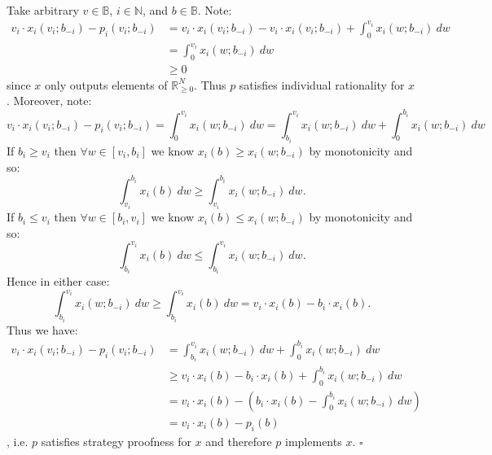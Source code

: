 \documentclass[11pt]{article}
\theoremstyle{definition}
\theoremstyle{plain}
\begin{document}
\\
Take arbitrary $v \in \mathbb{B}$, $i \in \mathbb{N}$, and $b \in \mathbb{B}$.
Note:
\begin{align*}
v_i\cdot x_i(v_i;b_{-i})-p_i(v_i;b_{-i})&=v_i\cdot x_i(v_i;b_{-i})-v_i \cdot
x_i(v_i;b_{-i})+\int_{0}^{v_i} x_i(w;b_{-i}) \ dw
\\
&=\int_{0}^{v_i} x_i(w;b_{-i}) \ dw
\\
&\geq 0
\end{align*}
since $x$ only outputs elements of $\mathbb{R}^N_{\geq 0}$. Thus $p$ satisfies
individual rationality for $x$. Moreover, note:
$$v_i\cdot x_i(v_i;b_{-i})-p_i(v_i;b_{-i})=\int_{0}^{v_i} x_i(w;b_{-i}) \ dw
=\int_{b_i}^{v_i}x_i(w;b_{-i}) \ dw+\int_{0}^{b_i}x_i(w;b_{-i}) \ dw$$
If $b_i \geq v_i$ then $\forall w \in [v_i,b_i]$ we know $x_i(b) \geq x_i(w;b_{-i})
$ by monotonicity and so:
$$\int_{v_i}^{b_i} x_i(b) \ dw \geq \int_{v_i}^{b_i} x_i(w; b_{-i}) \ dw.$$
If $b_i \leq v_i$ then $\forall w \in [b_i,v_i]$ we know $x_i(b) \leq x_i(w;b_{-i})
$ by monotonicity and so:
$$\int_{b_i}^{v_i} x_i(b) \ dw \leq \int_{b_i}^{v_i} x_i(w; b_{-i}) \ dw.$$
Hence in either case:
$$\int_{b_i}^{v_i} x_i(w; b_{-i}) \ dw \geq \int_{b_i}^{v_i} x_i(b) \ dw=v_i\cdot
x_i(b)-b_i\cdot x_i(b).$$
Thus we have:
\begin{align*}
v_i\cdot x_i(v_i;b_{-i})-p_i(v_i;b_{-i})&=\int_{b_i}^{v_i}x_i(w;b_{-i}) \ dw+
\int_{0}^{b_i}x_i(w;b_{-i}) \ dw
\\
&\geq v_i\cdot x_i(b)-b_i\cdot x_i(b)+\int_{0}^{b_i}x_i(w;b_{-i}) \ dw
\\
&=v_i\cdot x_i(b)-\left(b_i\cdot x_i(b)-\int_{0}^{b_i}x_i(w;b_{-i}) \ dw
\right)
\\
&=v_i\cdot x_i(b)-p_i(b)
\end{align*}
, i.e. $p$ satisfies strategy proofness for $x$ and therefore $p$ implements $x$.
$\square$
\end{document}
